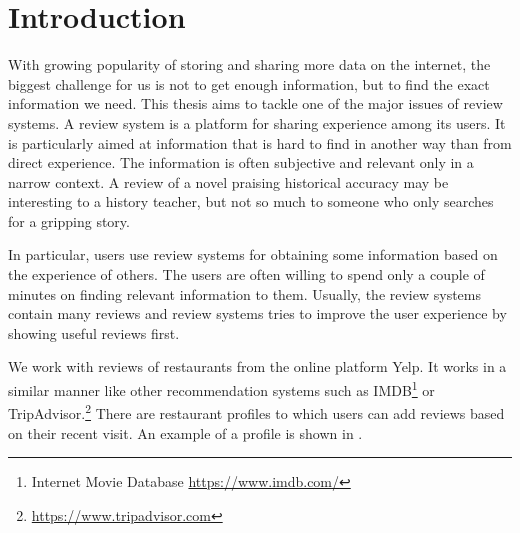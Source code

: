 \chapter*{Introduction}



With growing popularity of storing and sharing more data on the internet, the biggest challenge
for us is not to get enough information, but to find the exact information we need.
This thesis aims to tackle one of the major issues of review systems.
A review system is a platform for sharing experience among its users.
It is particularly aimed at information that is hard to find in another way than from direct experience.
The information is often subjective and relevant only in a narrow context.
A review of a novel praising historical accuracy may be interesting to a history teacher,
but not so much to someone who only searches for a gripping story.

In particular, users use review systems for obtaining some information based on the experience of others.
The users are often willing to spend only a couple of minutes on finding relevant information to them.
Usually, the review systems contain many reviews and review systems tries to improve the user experience by showing useful reviews first.

We work with reviews of restaurants from the online platform Yelp.
It works in a similar manner like other recommendation systems such as IMDB\footnote{Internet Movie Database \url{https://www.imdb.com/}} or
TripAdvisor.\footnote{\url{https://www.tripadvisor.com}}
There are restaurant profiles to which users can add reviews based on their recent visit.
An example of a profile is shown in .

